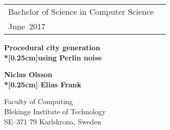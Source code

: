 \documentclass[a4paper,oneside]{bth}
\begin{document}
\pagestyle{plain}


\newcommand{\thesisMonth}{June}
\newcommand{\thesisYear}{2017}

\newcommand{\thesisDegree}{Bachelor of Science in Computer Science}

\newcommand{\thesisWeeks}{10}


{\pagestyle{empty}
\changepage{5cm}{1cm}{-0.5cm}{-0.5cm}{}{-2cm}{}{}{}
\noindent
\begin{tabular}{@{}p{} p{}}
\thesisDegree & \hfill\multirow{3}{*}{\bthcsnotextlogo{3cm}} \\
\thesisMonth \ \thesisYear & \\
\end{tabular}

\begin{center}

\vspace {7.5cm}

{\Huge\textbf{Procedural city generation\\*[0.25cm]using Perlin noise}}

\vspace {0.5cm}


\vspace {3cm}

{\Large\textbf{Niclas Olsson \\*[0.25cm] Elias Frank}} %

\end{center}

\vspace*{\fill}

\noindent%
{\small 
Faculty of Computing \\
Blekinge Institute of Technology \\
SE--371 79 Karlskrona, Sweden
}

\clearpage
} %
\end{document}
